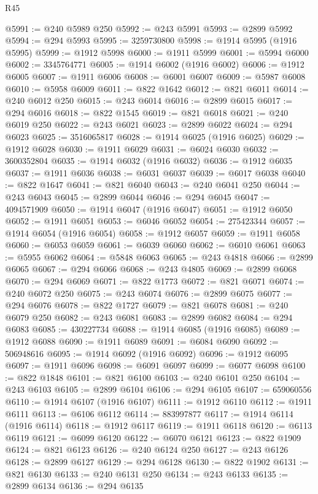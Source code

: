 \begin{lexlean}{R45}
\begin{coremodule}
{@5991 := @240 @5989 @250
@5992 := @243 @5991
@5993 := @2899 @5992
@5994 := @294 @5993
@5995 := 3259730800
@5998 := @1914 @5995 (@1916 @5995)
@5999 := @1912 @5998
@6000 := @1911 @5999
@6001 := @5994 @6000
@6002 := 3345764771
@6005 := @1914 @6002 (@1916 @6002)
@6006 := @1912 @6005
@6007 := @1911 @6006
@6008 := @6001 @6007
@6009 := @5987 @6008
@6010 := @5958 @6009
@6011 := @822 @1642
@6012 := @821 @6011
@6014 := @240 @6012 @250
@6015 := @243 @6014
@6016 := @2899 @6015
@6017 := @294 @6016
@6018 := @822 @1545
@6019 := @821 @6018
@6021 := @240 @6019 @250
@6022 := @243 @6021
@6023 := @2899 @6022
@6024 := @294 @6023
@6025 := 3516065817
@6028 := @1914 @6025 (@1916 @6025)
@6029 := @1912 @6028
@6030 := @1911 @6029
@6031 := @6024 @6030
@6032 := 3600352804
@6035 := @1914 @6032 (@1916 @6032)
@6036 := @1912 @6035
@6037 := @1911 @6036
@6038 := @6031 @6037
@6039 := @6017 @6038
@6040 := @822 @1647
@6041 := @821 @6040
@6043 := @240 @6041 @250
@6044 := @243 @6043
@6045 := @2899 @6044
@6046 := @294 @6045
@6047 := 4094571909
@6050 := @1914 @6047 (@1916 @6047)
@6051 := @1912 @6050
@6052 := @1911 @6051
@6053 := @6046 @6052
@6054 := 275423344
@6057 := @1914 @6054 (@1916 @6054)
@6058 := @1912 @6057
@6059 := @1911 @6058
@6060 := @6053 @6059
@6061 := @6039 @6060
@6062 := @6010 @6061
@6063 := @5955 @6062
@6064 := @5848 @6063
@6065 := @243 @4818
@6066 := @2899 @6065
@6067 := @294 @6066
@6068 := @243 @4805
@6069 := @2899 @6068
@6070 := @294 @6069
@6071 := @822 @1773
@6072 := @821 @6071
@6074 := @240 @6072 @250
@6075 := @243 @6074
@6076 := @2899 @6075
@6077 := @294 @6076
@6078 := @822 @1727
@6079 := @821 @6078
@6081 := @240 @6079 @250
@6082 := @243 @6081
@6083 := @2899 @6082
@6084 := @294 @6083
@6085 := 430227734
@6088 := @1914 @6085 (@1916 @6085)
@6089 := @1912 @6088
@6090 := @1911 @6089
@6091 := @6084 @6090
@6092 := 506948616
@6095 := @1914 @6092 (@1916 @6092)
@6096 := @1912 @6095
@6097 := @1911 @6096
@6098 := @6091 @6097
@6099 := @6077 @6098
@6100 := @822 @1848
@6101 := @821 @6100
@6103 := @240 @6101 @250
@6104 := @243 @6103
@6105 := @2899 @6104
@6106 := @294 @6105
@6107 := 659060556
@6110 := @1914 @6107 (@1916 @6107)
@6111 := @1912 @6110
@6112 := @1911 @6111
@6113 := @6106 @6112
@6114 := 883997877
@6117 := @1914 @6114 (@1916 @6114)
@6118 := @1912 @6117
@6119 := @1911 @6118
@6120 := @6113 @6119
@6121 := @6099 @6120
@6122 := @6070 @6121
@6123 := @822 @1909
@6124 := @821 @6123
@6126 := @240 @6124 @250
@6127 := @243 @6126
@6128 := @2899 @6127
@6129 := @294 @6128
@6130 := @822 @1902
@6131 := @821 @6130
@6133 := @240 @6131 @250
@6134 := @243 @6133
@6135 := @2899 @6134
@6136 := @294 @6135
}
\end{coremodule}
\end{lexlean}
